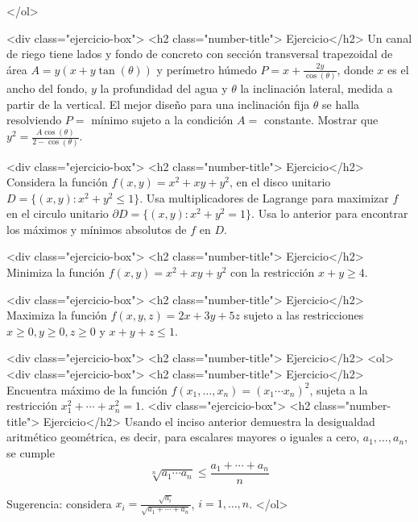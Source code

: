 \documentclass{article}
\theoremstyle{definition}
\begin{document}
          </ol>
          
        <div class="ejercicio-box"> <h2 class="number-title"> Ejercicio</h2> Un canal de riego tiene lados y fondo de concreto con
          sección transversal trapezoidal de área $A=y(x+y\tan(\theta))$
          y perímetro húmedo $P=x+\frac{2y}{\cos(\theta)}$, donde
          $x$ es el ancho del fondo, $y$ la profundidad del agua y
          $\theta$ la inclinación lateral, medida a partir de la
          vertical. El mejor dise\~no para una inclinación
          fija $\theta$ se halla resolviendo $P=$ mínimo
          sujeto a la condición $A=$ constante. Mostrar que
          $y^2=\frac{A\cos(\theta)}{2-\cos(\theta)}$.

        <div class="ejercicio-box"> <h2 class="number-title"> Ejercicio</h2> Considera la función $f(x,y)=x^2+xy+y^2$,
          en el disco unitario $D=\{(x,y): x^2+y^2 \leq 1\}$. Usa
          multiplicadores de Lagrange para maximizar $f$ en
          el circulo unitario  $\partial D=\{(x,y): x^2+y^2=1\}$. Usa
          lo anterior para encontrar los máximos y mínimos absolutos
          de $f$ en $D$.
          
        <div class="ejercicio-box"> <h2 class="number-title"> Ejercicio</h2> Minimiza la función $f(x,y)=x^2+xy+y^2$ con
          la restricción $x+y \geq 4$.

          
          
        <div class="ejercicio-box"> <h2 class="number-title"> Ejercicio</h2> Maximiza la función $f(x,y,z)=2x+3y+5z$ sujeto
          a las restricciones $x\geq 0, y\geq 0, z\geq 0 $ y
          $x+y+z \leq 1$.


        <div class="ejercicio-box"> <h2 class="number-title"> Ejercicio</h2> 
          <ol>
          <div class="ejercicio-box"> <h2 class="number-title"> Ejercicio</h2> Encuentra máximo de la función
            $f(x_1,\dots, x_n)=(x_1\cdots x_n)^2$, sujeta a la
            restricción $x_1^2+\cdots +x_n^2=1$.
          <div class="ejercicio-box"> <h2 class="number-title"> Ejercicio</h2> Usando el inciso anterior demuestra la
            desigualdad aritmético geométrica, es decir,
            para escalares mayores o iguales a cero, $a_1,\dots, a_n$,
            se cumple
            $$
            \sqrt[n]{a_1\cdots a_n} \leq \frac{a_1+\cdots +a_n}{n}
            $$

            Sugerencia: considera
            $x_i=\frac{\sqrt{a_i}}{\sqrt{a_1+\cdots +a_n}}$, $i=1,\dots,n$.
          </ol>
\end{document}
